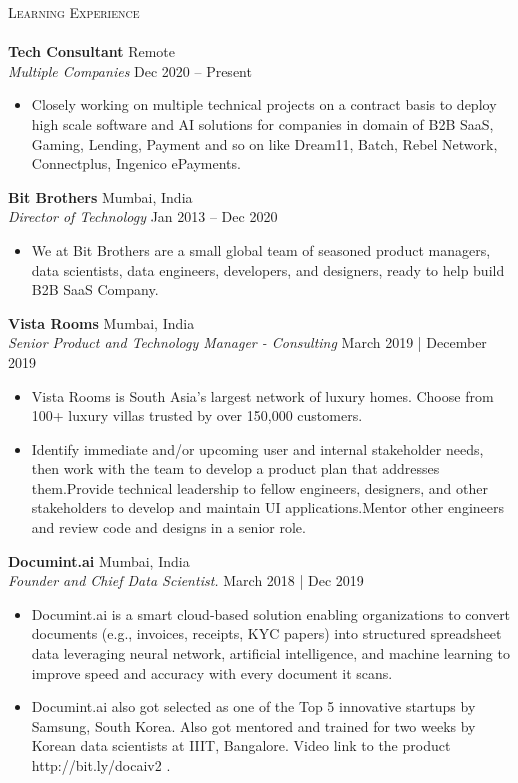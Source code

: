 \documentclass[a4paper]{article}
\newcommand{\lineunder} {
    \vspace*{-8pt} \\
    \hspace*{-18pt} \hrulefill \\
}
\newcommand{\header} [1] {
    {\hspace*{-18pt}\vspace*{6pt} \textsc{#1}}
    \vspace*{-6pt} \lineunder
}
\begin{document}
\header{Learning Experience}
\vspace{1mm}
\textbf{Tech Consultant} \hfill Remote\\
\textit{Multiple Companies } \hfill Dec 2020 – Present\\
\vspace{-1mm}
\begin{itemize} \itemsep 1pt
	\item Closely working on multiple technical projects on a contract basis to deploy high scale software and AI solutions for companies in domain of B2B SaaS, Gaming, Lending, Payment and so on like Dream11, Batch, Rebel Network, Connectplus, Ingenico ePayments.
\end{itemize}
\textbf{Bit Brothers} \hfill Mumbai, India\\
\textit{Director of Technology } \hfill Jan 2013 – Dec 2020\\
\vspace{-1mm}
\begin{itemize} \itemsep 1pt
	\item We at Bit Brothers are a small global team of seasoned product managers, data scientists, data engineers, developers, and designers, ready to help build B2B SaaS Company.
\end{itemize}
\textbf{Vista Rooms} \hfill Mumbai, India\\
\textit{Senior Product and Technology Manager - Consulting} \hfill March 2019 | December 2019\\
\vspace{-1mm}
\begin{itemize} \itemsep 1pt
	\item Vista Rooms is South Asia's largest network of luxury homes. Choose from 100+ luxury villas trusted by over 150,000 customers.
	\item Identify immediate and/or upcoming user and internal stakeholder needs, then work with the team to develop a product plan that addresses them.Provide technical leadership to fellow engineers, designers, and other stakeholders to develop and maintain UI applications.Mentor other engineers and review code and designs in a senior role.
\end{itemize}
\textbf{Documint.ai} \hfill Mumbai, India\\
\textit{Founder and Chief Data Scientist.} \hfill March 2018 | Dec 2019\\
\vspace{-1mm}
\begin{itemize} \itemsep 1pt
	\item Documint.ai is a smart cloud-based solution enabling organizations to convert documents (e.g., invoices, receipts, KYC papers) into structured spreadsheet data leveraging neural network, artificial intelligence, and machine learning to improve speed and accuracy with every document it scans.
	\item Documint.ai also got selected as one of the Top 5 innovative startups by Samsung, South Korea. Also got mentored and trained for two weeks by Korean data scientists at IIIT, Bangalore. Video link to the product http://bit.ly/docaiv2 .
\end{itemize}
\end{document}

